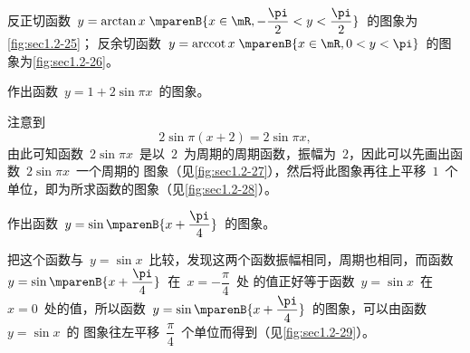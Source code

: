 反正切函数~$y=\arctan x\;\mparenB{x\in\mR,-\dfrac\pi2<y<\dfrac\pi2}$~的图象为\ref{fig:sec1.2-25}；%
反余切函数~$y=\arccot x\;\mparenB{x\in\mR,0<y<\pi}$~的图象为\ref{fig:sec1.2-26}。

\begin{figure}
\begin{floatrow}
\end{floatrow}
\newFRline
\begin{floatrow}
\end{floatrow}
\end{figure}

\begin{example}
作出函数~$y=1+2\sin\pi x$~的图象。
\end{example}
\begin{solution}
注意到
\[
  2\sin\pi(x+2)=2\sin\pi x,
\]
由此可知函数~$2\sin\pi x$~是以~$2$~为周期的周期函数，振幅为~$2$，因此可以先画出函数~$2\sin\pi x$~一个周期的
图象（见\ref{fig:sec1.2-27}），然后将此图象再往上平移~$1$~个单位，即为所求函数的图象（见\ref{fig:sec1.2-28}）。
\end{solution}

\begin{figure}
\begin{floatrow}[3]
\figurebox{\caption{}\label{fig:sec1.2-27}}
          {\somefigure}
\figurebox{\caption{}\label{fig:sec1.2-28}}
          {\somefigure}
\figurebox{\caption{}\label{fig:sec1.2-29}}
          {\somefigure}
\end{floatrow}
\end{figure}

\begin{example}
作出函数~$y=\sin\mparenB{x+\dfrac\pi4}$~的图象。
\end{example}
\begin{solution}
把这个函数与~$y=\sin x$~比较，发现这两个函数振幅相同，周期也相同，而函数~$y=\sin\mparenB{x+\dfrac\pi4}$~在~$x=-\dfrac\pi4$~处
的值正好等于函数~$y=\sin x$~在~$x=0$~处的值，所以函数~$y=\sin\mparenB{x+\dfrac\pi4}$~的图象，可以由函数~$y=\sin x$~的
图象往左平移~$\dfrac\pi4$~个单位而得到（见\ref{fig:sec1.2-29}）。
\end{solution}

